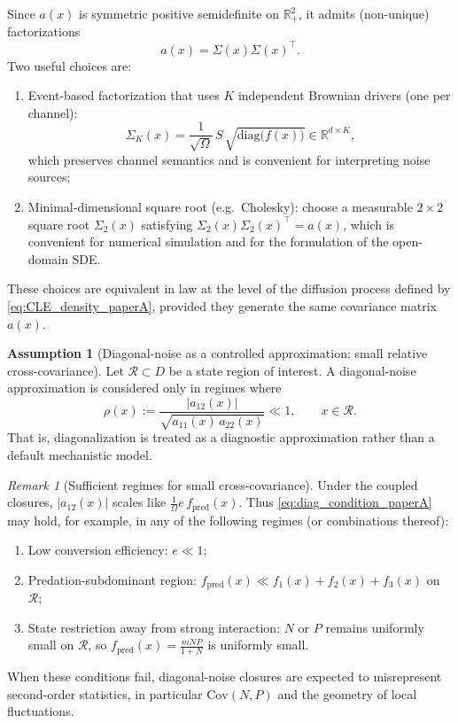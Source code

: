 \documentclass[pdflatex,sn-mathphys-ay]{sn-jnl}
\theoremstyle{thmstyleone}
\theoremstyle{definition}
\newtheorem{assumption}[theorem]{Assumption}
\theoremstyle{remark}
\newtheorem{remark}[theorem]{Remark}
\begin{document}
Since \(a(x)\) is symmetric positive semidefinite on \(\mathbb R_+^2\), it admits (non-unique) factorizations
\begin{equation}
\label{eq:factorization_paperA}
a(x)=\Sigma(x)\Sigma(x)^\top.
\end{equation}
Two useful choices are:
\begin{enumerate}[label=(\roman*)]
\item Event-based factorization that uses \(K\) independent Brownian drivers (one per channel):
\begin{equation*}
\Sigma_K(x)
=
\frac{1}{\sqrt{\Omega}}\,
S\,\sqrt{\mathrm{diag}\big(f(x)\big)}
\in\mathbb R^{d\times K},
\end{equation*}
which preserves channel semantics and is convenient for interpreting noise sources;
\item Minimal-dimensional square root (e.g.\ Cholesky):
choose a measurable \(2\times2\) square root \(\Sigma_2(x)\) satisfying \(\Sigma_2(x)\Sigma_2(x)^\top=a(x)\), which is convenient for numerical simulation and for the formulation of the open-domain SDE.
\end{enumerate}
These choices are equivalent in law at the level of the diffusion process defined by \eqref{eq:CLE_density_paperA}, provided they generate the same covariance matrix \(a(x)\).

\begin{assumption}[Diagonal-noise as a controlled approximation: small relative cross-covariance]
\label{ass:diag_condition_paperA}
Let \(\mathcal R\subset D\) be a state region of interest. A diagonal-noise approximation is considered only in regimes where
\begin{equation}
\label{eq:diag_condition_paperA}
\rho(x):=\frac{|a_{12}(x)|}{\sqrt{a_{11}(x)\,a_{22}(x)}}\ll 1,
\qquad x\in\mathcal R.
\end{equation}
That is, diagonalization is treated as a diagnostic approximation rather than a default mechanistic model.
\end{assumption}

\begin{remark}[Sufficient regimes for small cross-covariance]
\label{rmk:sufficient_diag_paperA}
Under the coupled closures, \(|a_{12}(x)|\) scales like \(\frac{1}{\Omega}e\,f_{\mathrm{pred}}(x)\). Thus \eqref{eq:diag_condition_paperA} may hold, for example, in any of the following regimes (or combinations thereof):
\begin{enumerate}[label=\textnormal{(\roman*)}]
\item Low conversion efficiency: \(e\ll 1\);
\item Predation-subdominant region: \(f_{\mathrm{pred}}(x)\ll f_1(x)+f_2(x)+f_3(x)\) on \(\mathcal R\);
\item State restriction away from strong interaction: \(N\) or \(P\) remains uniformly small on \(\mathcal R\), so \(f_{\mathrm{pred}}(x)=\frac{mNP}{1+N}\) is uniformly small.
\end{enumerate}
When these conditions fail, diagonal-noise closures are expected to misrepresent second-order statistics, in particular \(\mathrm{Cov}(N,P)\) and the geometry of local fluctuations.
\end{remark}
\end{document}
